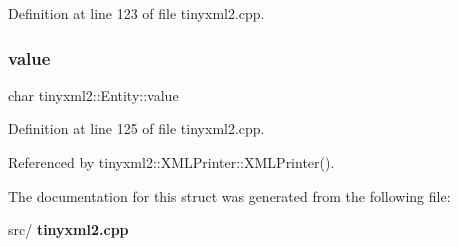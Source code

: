 Definition at line 123 of file tinyxml2.\+cpp.

\mbox{\label{structtinyxml2_1_1_entity_a7334e81e33b4615655a403711b24f3ed}} 
\subsubsection{value}
{\footnotesize\ttfamily char tinyxml2\+::\+Entity\+::value}



Definition at line 125 of file tinyxml2.\+cpp.



Referenced by tinyxml2\+::\+X\+M\+L\+Printer\+::\+X\+M\+L\+Printer().



The documentation for this struct was generated from the following file\+:\begin{DoxyCompactItemize}
\item 
src/\textbf{ tinyxml2.\+cpp}\end{DoxyCompactItemize}
